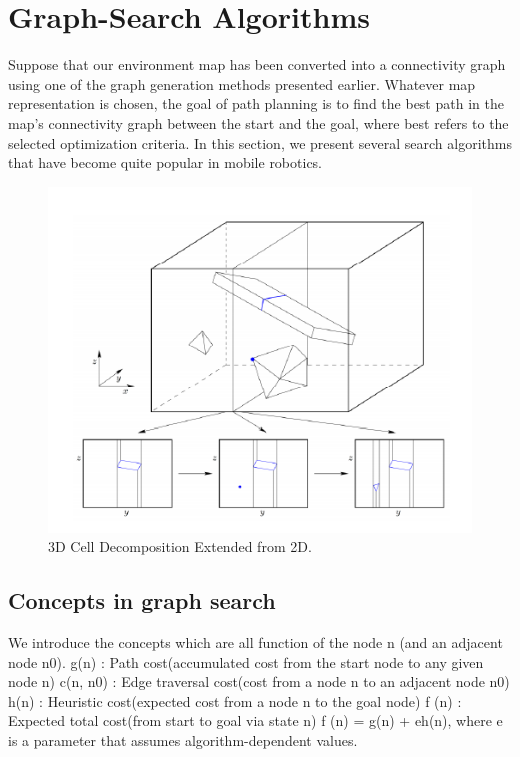 \documentclass[twoside]{article}
\begin{document}
\section{Graph-Search Algorithms}
Suppose that our environment map has been converted into a connectivity graph using one of the graph generation methods presented earlier. Whatever map representation is chosen, the goal of path planning is to find the best path in the map’s connectivity graph between the start and the goal, where best refers to the selected optimization criteria. In this section, we present several search algorithms that have become
quite popular in mobile robotics.

\begin{figure}[h]
\begin{center}
\includegraphics{fig15_7.PNG}
\caption{3D Cell Decomposition Extended from 2D.}
\end{center}
\end{figure}

\subsection{Concepts in graph search}
We introduce the concepts which are all function of the node n (and an adjacent node n0).
g(n) : Path cost(accumulated cost from the start node to any given node n)
c(n, n0) : Edge traversal cost(cost from a node n to an adjacent node n0)
h(n) : Heuristic cost(expected cost from a node n to the goal node)
f (n) : Expected total cost(from start to goal via state n)
f (n) = g(n) + eh(n), where e is a parameter that assumes algorithm-dependent values.
\end{document}
